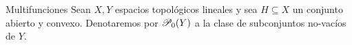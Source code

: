 \begin{frame}{Multifunciones}
    Sean $X, Y$ espacios topológicos lineales y sea 
    $H\subseteq X$ un conjunto abierto y convexo. Denotaremos 
    por $\P_0(Y)$ a la clase de subconjuntos no-vacíos 
    de $Y$.
    
\end{frame}